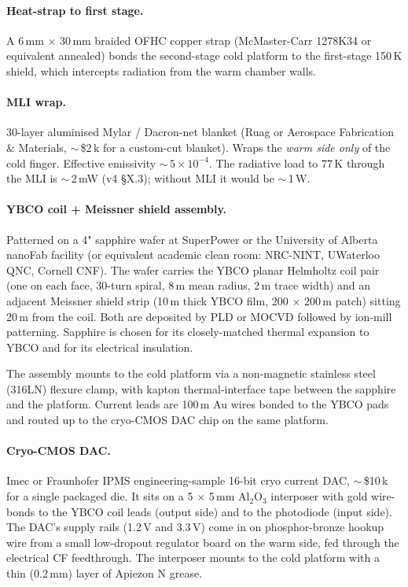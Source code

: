 \documentclass[11pt,letterpaper]{article}
\begin{document}
\paragraph{Heat-strap to first stage.} A 6\,mm $\times$ 30\,mm braided OFHC copper strap (McMaster-Carr 1278K34 or equivalent annealed) bonds the second-stage cold platform to the first-stage 150\,K shield, which intercepts radiation from the warm chamber walls.

\paragraph{MLI wrap.} 30-layer aluminised Mylar / Dacron-net blanket (Ruag or Aerospace Fabrication \& Materials, $\sim$\,\$2\,k for a custom-cut blanket). Wraps the \textit{warm side only} of the cold finger. Effective emissivity $\sim$\,$5 \times 10^{-4}$. The radiative load to 77\,K through the MLI is $\sim$\,2\,mW (v4 \S X.3); without MLI it would be $\sim$\,1\,W.

\paragraph{YBCO coil + Meissner shield assembly.} Patterned on a 4" sapphire wafer at SuperPower or the University of Alberta nanoFab facility (or equivalent academic clean room: NRC-NINT, UWaterloo QNC, Cornell CNF). The wafer carries the YBCO planar Helmholtz coil pair (one on each face, 30-turn spiral, 8\,\textmu m mean radius, 2\,\textmu m trace width) and an adjacent Meissner shield strip (10\,\textmu m thick YBCO film, 200 $\times$ 200\,\textmu m patch) sitting 20\,\textmu m from the coil. Both are deposited by PLD or MOCVD followed by ion-mill patterning. Sapphire is chosen for its closely-matched thermal expansion to YBCO and for its electrical insulation.

The assembly mounts to the cold platform via a non-magnetic stainless steel (316LN) flexure clamp, with kapton thermal-interface tape between the sapphire and the platform. Current leads are 100\,\textmu m Au wires bonded to the YBCO pads and routed up to the cryo-CMOS DAC chip on the same platform.

\paragraph{Cryo-CMOS DAC.} Imec or Fraunhofer IPMS engineering-sample 16-bit cryo current DAC, $\sim$\,\$10\,k for a single packaged die. It sits on a 5 $\times$ 5\,mm Al$_2$O$_3$ interposer with gold wire-bonds to the YBCO coil leads (output side) and to the photodiode (input side). The DAC's supply rails (1.2\,V and 3.3\,V) come in on phosphor-bronze hookup wire from a small low-dropout regulator board on the warm side, fed through the electrical CF feedthrough. The interposer mounts to the cold platform with a thin (0.2\,mm) layer of Apiezon N grease.
\end{document}
